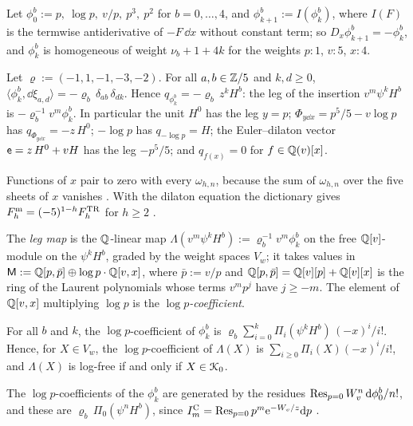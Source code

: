 Let $\phi^b_0:=p,\ \log p,\ v/p,\ p^3,\ p^2$ for $b=0,\dots,4$, and $\phi^b_{k+1}:=I(\phi^b_k)$, where $I(F)$ is the termwise antiderivative of $-F\,\dd x$ without constant term; so $D_x\phi^b_{k+1}=-\phi^b_k$, and $\phi^b_k$ is homogeneous of weight $\nu_b+1+4k$ for the weights $p:1$, $v:5$, $x:4$.

\begin{prop}
\label{prop:mod-LD}
Let $\varrho:=(-1,1,-1,-3,-2)$. For all $a,b\in\mathbb{Z}/5$ and $k,d\geq0$, $\langle\phi^b_k,\dd\xi_{a,d}\rangle=-\varrho_b\,\delta_{ab}\,\delta_{dk}$. Hence $q_{\phi^b_k}=-\varrho_b\,z^kH^b$: the leg of the insertion $v^m\psi^kH^b$ is $-\varrho_b^{-1}v^m\phi^b_k$. In particular the unit $H^0$ has the leg $y=p$; $\Phi_{y\dd x}=p^5/5-v\log p$ has $q_{\Phi_{y\dd x}}=-z\,H^0$; $-\log p$ has $q_{-\log p}=H$; the Euler--dilaton vector $\mathsf{e}=z\,H^0+vH$ has the leg $-p^5/5$; and $q_{f(x)}=0$ for $f\in\mathbb{Q}(v)[x]$.
\end{prop}

Functions of $x$ pair to zero with every $\omega_{h,n}$, because the sum of $\omega_{h,n}$ over the five sheets of $x$ vanishes . With the dilaton equation the dictionary gives $F^{\mathrm{m}}_h=(-5)^{1-h}F^{\mathrm{TR}}_h$ for $h\geq2$ .

The \emph{leg map} is the $\mathbb{Q}$-linear map $\Lambda(v^m\psi^kH^b):=\varrho_b^{-1}v^m\phi^b_k$ on the free $\mathbb{Q}[v]$-module on the $\psi^kH^b$, graded by the weight spaces $V_w$; it takes values in $\mathsf M:=\mathbb{Q}[p,\bar p]\oplus\log p\cdot\mathbb{Q}[v,x]$, where $\bar p:=v/p$ and $\mathbb{Q}[p,\bar p]=\mathbb{Q}[v][p]+\mathbb{Q}[v][x]$ is the ring of the Laurent polynomials whose terms $v^mp^j$ have $j\geq-m$. The element of $\mathbb{Q}[v,x]$ multiplying $\log p$ is the \emph{$\log p$-coefficient}.

\begin{prop}
\label{prop:mod-dii}
For all $b$ and $k$, the $\log p$-coefficient of $\phi^b_k$ is $\varrho_b\sum_{i=0}^k\Pi_i(\psi^kH^b)\,(-x)^i/i!$. Hence, for $X\in V_w$, the $\log p$-coefficient of $\Lambda(X)$ is $\sum_{i\geq0}\Pi_i(X)(-x)^i/i!$, and $\Lambda(X)$ is log-free if and only if $X\in\mathcal{K}_{0}$.
\end{prop}

\begin{sketch}
The $\log p$-coefficients of the $\phi^b_k$ are generated by the residues $\operatorname*{Res}_{p=0}W_{v}^n\,\mathrm{d}\phi^b_0/n!$, and these are $\varrho_b\,\Pi_0(\psi^nH^b)$, since $I^{\mathrm{C}}_m=\operatorname*{Res}_{p=0}p^m\mathrm{e}^{-W_{v}/z}\mathrm{d} p$ .
\end{sketch}

